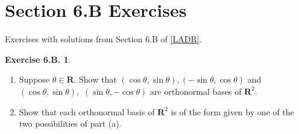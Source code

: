 \documentclass[12pt]{article}
\theoremstyle{definition}
\theoremstyle{exercise}
\newtheorem{exercise}{Exercise 6.B.}
\theoremstyle{solution}
\newcommand{\R}{\mathbf{R}}
\begin{document}
\section{Section 6.B Exercises}

Exercises with solutions from Section 6.B of \hyperlink{ladr}{[LADR]}.

\begin{exercise}
\label{ex:1}
    \begin{enumerate}
        \item Suppose \( \theta \in \R \). Show that \( ( \cos \theta, \sin \theta ), ( -\sin \theta, \cos \theta ) \) and \( ( \cos \theta, \sin \theta ), \) \( ( \sin \theta, -\cos \theta ) \) are orthonormal bases of \( \R^2 \).

        \item Show that each orthonormal basis of \( \R^2 \) is of the form given by one of the two possibilities of part (a).
    \end{enumerate}
\end{exercise}
\end{document}
